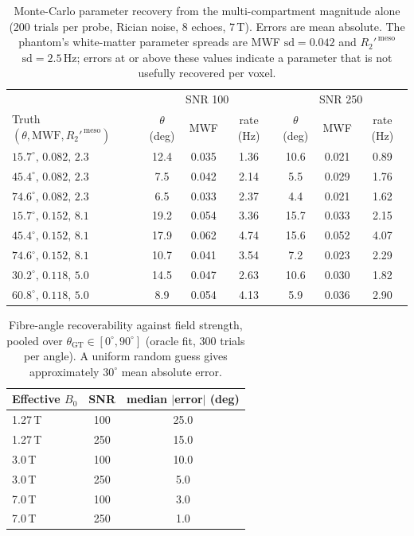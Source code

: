 \documentclass[AMA,STIX2COL,Linenumberson]{MRM}
\begin{document}
\begin{table}[t]
\caption{Monte-Carlo parameter recovery from the multi-compartment magnitude alone (200 trials per probe, Rician noise, 8 echoes, 7\,T). Errors are mean absolute. The phantom's white-matter parameter spreads are MWF $\mathrm{sd}=0.042$ and $R_2'^{\,\mathrm{meso}}$ $\mathrm{sd}=2.5$\,Hz; errors at or above these values indicate a parameter that is not usefully recovered per voxel.}
\label{tab:mc}
\centering
\begin{tabular}{lccc|ccc}
\hline
 & \multicolumn{3}{c|}{SNR 100} & \multicolumn{3}{c}{SNR 250} \\
Truth $(\theta,\mathrm{MWF},R_2'^{\,\mathrm{meso}})$ & $\theta$ (deg) & MWF & rate (Hz) & $\theta$ (deg) & MWF & rate (Hz) \\
\hline
$15.7^\circ,\,0.082,\,2.3$ & 12.4 & 0.035 & 1.36 & 10.6 & 0.021 & 0.89 \\
$45.4^\circ,\,0.082,\,2.3$ & 7.5 & 0.042 & 2.14 & 5.5 & 0.029 & 1.76 \\
$74.6^\circ,\,0.082,\,2.3$ & 6.5 & 0.033 & 2.37 & 4.4 & 0.021 & 1.62 \\
$15.7^\circ,\,0.152,\,8.1$ & 19.2 & 0.054 & 3.36 & 15.7 & 0.033 & 2.15 \\
$45.4^\circ,\,0.152,\,8.1$ & 17.9 & 0.062 & 4.74 & 15.6 & 0.052 & 4.07 \\
$74.6^\circ,\,0.152,\,8.1$ & 10.7 & 0.041 & 3.54 & 7.2 & 0.023 & 2.29 \\
$30.2^\circ,\,0.118,\,5.0$ & 14.5 & 0.047 & 2.63 & 10.6 & 0.030 & 1.82 \\
$60.8^\circ,\,0.118,\,5.0$ & 8.9 & 0.054 & 4.13 & 5.9 & 0.036 & 2.90 \\
\hline
\end{tabular}
\end{table}

\begin{table}[t]
\caption{Fibre-angle recoverability against field strength, pooled over $\theta_{\mathrm{GT}}\in[0^\circ,90^\circ]$ (oracle fit, 300 trials per angle). A uniform random guess gives approximately $30^\circ$ mean absolute error.}
\label{tab:field}
\centering
\begin{tabular}{lcc}
\hline
Effective $B_0$ & SNR & median $|$error$|$ (deg) \\
\hline
1.27\,T & 100 & 25.0 \\
1.27\,T & 250 & 15.0 \\
3.0\,T & 100 & 10.0 \\
3.0\,T & 250 & 5.0 \\
7.0\,T & 100 & 3.0 \\
7.0\,T & 250 & 1.0 \\
\hline
\end{tabular}
\end{table}
\end{document}
